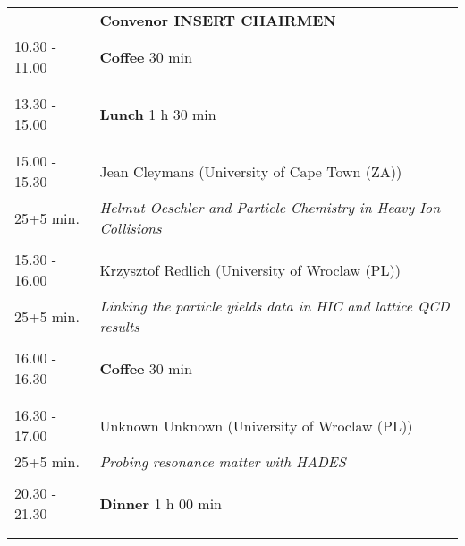 \begin{longtable}{p{3cm}p{13cm}}
&\hfill {\bf Convenor INSERT CHAIRMEN }\\ 
10.30 - 11.00 & {\bf Coffee} \hfill 30 min \\ 
 & \\ 
 & \\ 
13.30 - 15.00 & {\bf Lunch} \hfill 1 h 30 min \\ 
 & \\ 
 & \\ 
15.00 - 15.30 & Jean Cleymans (University of Cape Town (ZA))\\ 
25+5 min. & {\it Helmut Oeschler and Particle Chemistry in Heavy Ion Collisions}\\ 
 & \\ 
15.30 - 16.00 & Krzysztof Redlich (University of Wroclaw (PL))\\ 
25+5 min. & {\it Linking the particle yields data in HIC and lattice QCD results}\\ 
 & \\ 
16.00 - 16.30 & {\bf Coffee} \hfill 30 min \\ 
 & \\ 
 & \\ 
16.30 - 17.00 & Unknown Unknown (University of Wroclaw (PL))\\ 
25+5 min. & {\it Probing resonance matter with HADES}\\ 
 & \\ 
20.30 - 21.30 & {\bf Dinner} \hfill 1 h 00 min \\ 
 & \\ 
 & \\ 
\end{longtable}

